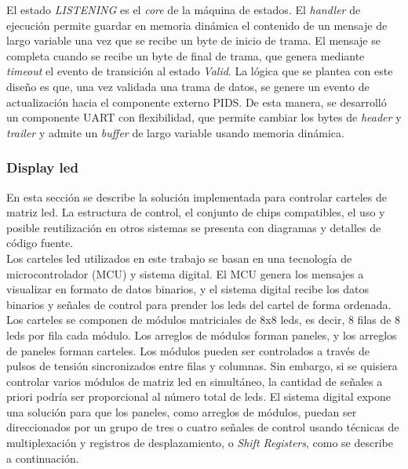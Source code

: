 El estado \textit{LISTENING} es el \textit{core} de la máquina de estados. El \textit{handler} de ejecución permite guardar en memoria dinámica el contenido de un mensaje de largo variable una vez que se recibe un byte de inicio de trama.  El mensaje se completa cuando se recibe un byte de final de trama, que genera mediante \textit{timeout} el evento de transición al estado \textit{Valid}. La lógica que se plantea con este diseño es que, una vez validada una trama de datos, se genere un evento de actualización hacia el componente externo PIDS. De esta manera, se desarrolló un componente UART con flexibilidad, que permite cambiar los bytes de \textit{header} y \textit{trailer} y admite un \textit{buffer} de largo variable usando memoria dinámica. \\

\subsubsection{Display led}

En esta sección se describe la solución implementada para controlar carteles de matriz led. La estructura de control, el conjunto de chips compatibles, el uso y posible reutilización en otros sistemas se presenta con diagramas y detalles de código fuente. \\

Los carteles led utilizados en este trabajo se basan en una tecnología de microcontrolador (MCU) y sistema digital. El MCU genera los mensajes a visualizar en formato de datos binarios, y el sistema digital recibe los datos binarios y señales de control para prender los leds del cartel de forma ordenada. Los carteles se componen de módulos matriciales de 8x8 leds, es decir, 8 filas de 8 leds por fila cada módulo. Los arreglos de módulos forman paneles, y los arreglos de paneles forman carteles. Los módulos  pueden ser controlados a través de pulsos de tensión sincronizados entre filas y columnas. Sin embargo, si se quisiera controlar varios módulos de matriz led en simultáneo, la cantidad de señales a priori podría ser proporcional al número total de leds. El sistema digital expone una solución para que los paneles, como arreglos de módulos, puedan ser direccionados por un grupo de tres o cuatro señales de control usando técnicas de multiplexación y registros de desplazamiento, o \textit{Shift Registers}, como se describe a continuación. \\


